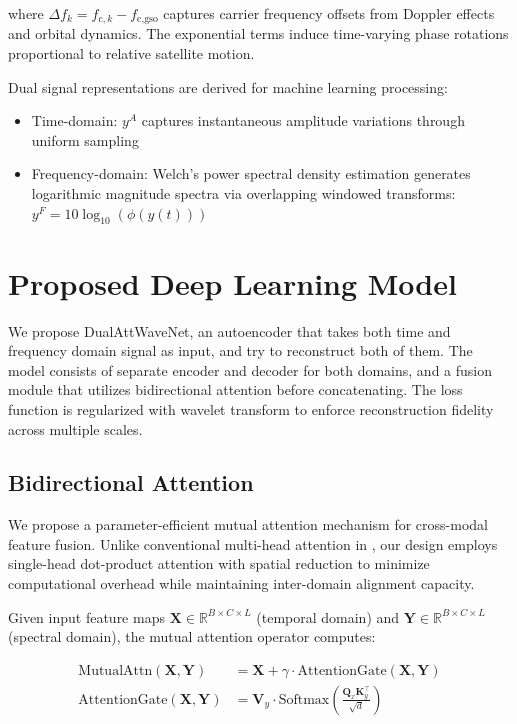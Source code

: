 \documentclass[10pt, conference]{IEEEtran}
\begin{document}
where $\Delta f_k = f_{\text{c},k} - f_{\text{c,gso}}$ captures carrier frequency offsets from Doppler effects and orbital dynamics. The exponential terms induce time-varying phase rotations proportional to relative satellite motion.

Dual signal representations are derived for machine learning processing:
\begin{itemize}
    \item Time-domain: $y^A$ captures instantaneous amplitude variations through uniform sampling
    \item Frequency-domain: Welch's power spectral density estimation generates logarithmic magnitude spectra via overlapping windowed transforms: $y^F = 10\log_{10}(\phi(y(t)))$
\end{itemize}

\section{Proposed Deep Learning Model}

We propose DualAttWaveNet, an autoencoder that takes both time and frequency domain signal as input, and try to reconstruct both of them. The model consists of separate encoder and decoder for both domains, and a fusion module that utilizes bidirectional attention before concatenating. The loss function is regularized with wavelet transform to enforce reconstruction fidelity across multiple scales.

\subsection{Bidirectional Attention}
\label{subsec:bi_attn}

We propose a parameter-efficient mutual attention mechanism for cross-modal feature fusion. Unlike conventional multi-head attention in \cite{vaswaniAttentionAllYou2017}, our design employs single-head dot-product attention with spatial reduction to minimize computational overhead while maintaining inter-domain alignment capacity.

Given input feature maps $\mathbf{X} \in \mathbb{R}^{B \times C \times L}$ (temporal domain) and $\mathbf{Y} \in \mathbb{R}^{B \times C \times L}$ (spectral domain), the mutual attention operator computes:

\begin{equation}
    \begin{aligned}
        \text{MutualAttn}(\mathbf{X}, \mathbf{Y})    & = \mathbf{X} + \gamma \cdot \text{AttentionGate}(\mathbf{X}, \mathbf{Y})                        \\
        \text{AttentionGate}(\mathbf{X}, \mathbf{Y}) & = \mathbf{V}_y \cdot \text{Softmax}\left(\frac{\mathbf{Q}_x \mathbf{K}_y^\top}{\sqrt{d}}\right)
    \end{aligned}
\end{equation}
\end{document}
